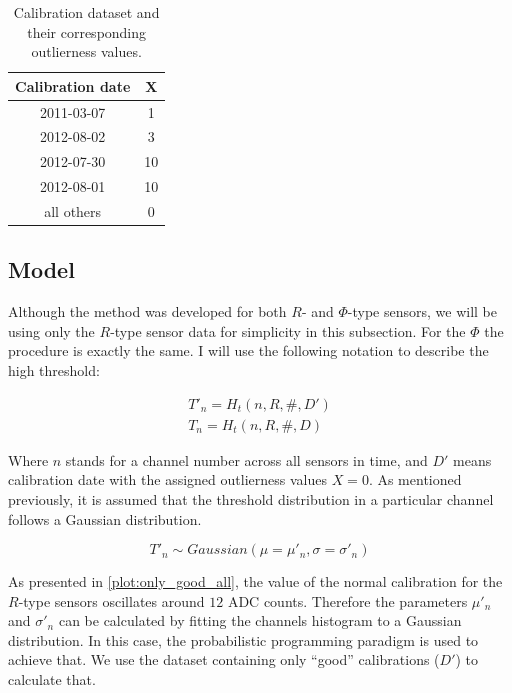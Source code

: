 \begin{table}[h]

\begin{center}
\begin{tabular}{ |c|c| }
\hline
Calibration date& X\\
\hline
2011-03-07&1\\
2012-08-02&3\\
2012-07-30&10\\
2012-08-01&10\\
all others&0\\
\hline
\end{tabular}
\end{center}
\caption{\label{data-table} Calibration dataset and their corresponding outlierness values.}
\end{table}

\subsection{Model}

Although the method was developed for both $R$- and $\Phi$-type sensors, we will be using only the $R$-type sensor data for simplicity in this subsection. For the $\Phi$ the procedure is exactly the same. I will use the following notation to describe the high threshold:


\begin{align}
  T\prime_n = H_{t}(n, R, \#, D\prime) \\
  T_n = H_{t}(n, R, \#, D)
  \label{eq:notation}
  \end{align}

  Where $n$ stands for a channel number across all sensors in time, and $D\prime$ means calibration date with the assigned outlierness values $X=0$.
As mentioned previously, it is assumed that the threshold distribution in a particular channel follows a Gaussian distribution.

\begin{equation}
    T\prime_n \sim Gaussian(\mu=\mu\prime_n, \sigma=\sigma\prime_n)
  \label{eq:basic-model}
  \end{equation}

As presented in \ref{plot:only_good_all}, the value of the normal calibration for the $R$-type sensors oscillates around $12$ ADC counts.
Therefore the parameters $\mu\prime_{n}$ and $\sigma\prime_{n}$ can be calculated by fitting the channels histogram to a Gaussian distribution.
In this case, the probabilistic programming paradigm is used to achieve that. We use the dataset containing only ``good'' calibrations ($D\prime$) to calculate that.

